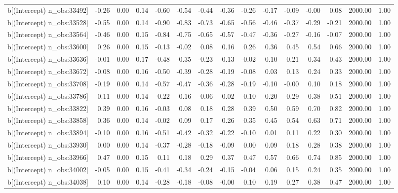 \begin{table}[ht]
\begin{tabular}{rrrrrrrrrrrrrrr}
  b[(Intercept) n\_obs:33492] & -0.26 & 0.00 & 0.14 & -0.60 & -0.54 & -0.44 & -0.36 & -0.26 & -0.17 & -0.09 & -0.00 & 0.08 & 2000.00 & 1.00 \\ 
  b[(Intercept) n\_obs:33528] & -0.55 & 0.00 & 0.14 & -0.90 & -0.83 & -0.73 & -0.65 & -0.56 & -0.46 & -0.37 & -0.29 & -0.21 & 2000.00 & 1.00 \\ 
  b[(Intercept) n\_obs:33564] & -0.46 & 0.00 & 0.15 & -0.84 & -0.75 & -0.65 & -0.57 & -0.47 & -0.36 & -0.27 & -0.16 & -0.07 & 2000.00 & 1.00 \\ 
  b[(Intercept) n\_obs:33600] & 0.26 & 0.00 & 0.15 & -0.13 & -0.02 & 0.08 & 0.16 & 0.26 & 0.36 & 0.45 & 0.54 & 0.66 & 2000.00 & 1.00 \\ 
  b[(Intercept) n\_obs:33636] & -0.01 & 0.00 & 0.17 & -0.48 & -0.35 & -0.23 & -0.13 & -0.02 & 0.10 & 0.21 & 0.34 & 0.43 & 2000.00 & 1.00 \\ 
  b[(Intercept) n\_obs:33672] & -0.08 & 0.00 & 0.16 & -0.50 & -0.39 & -0.28 & -0.19 & -0.08 & 0.03 & 0.13 & 0.24 & 0.33 & 2000.00 & 1.00 \\ 
  b[(Intercept) n\_obs:33708] & -0.19 & 0.00 & 0.14 & -0.57 & -0.47 & -0.36 & -0.28 & -0.19 & -0.10 & -0.00 & 0.10 & 0.18 & 2000.00 & 1.00 \\ 
  b[(Intercept) n\_obs:33786] & 0.11 & 0.00 & 0.14 & -0.22 & -0.16 & -0.06 & 0.02 & 0.10 & 0.20 & 0.29 & 0.38 & 0.51 & 2000.00 & 1.00 \\ 
  b[(Intercept) n\_obs:33822] & 0.39 & 0.00 & 0.16 & -0.03 & 0.08 & 0.18 & 0.28 & 0.39 & 0.50 & 0.59 & 0.70 & 0.82 & 2000.00 & 1.00 \\ 
  b[(Intercept) n\_obs:33858] & 0.36 & 0.00 & 0.14 & -0.02 & 0.09 & 0.17 & 0.26 & 0.35 & 0.45 & 0.54 & 0.63 & 0.71 & 2000.00 & 1.00 \\ 
  b[(Intercept) n\_obs:33894] & -0.10 & 0.00 & 0.16 & -0.51 & -0.42 & -0.32 & -0.22 & -0.10 & 0.01 & 0.11 & 0.22 & 0.30 & 2000.00 & 1.00 \\ 
  b[(Intercept) n\_obs:33930] & 0.00 & 0.00 & 0.14 & -0.37 & -0.28 & -0.18 & -0.09 & 0.00 & 0.09 & 0.18 & 0.28 & 0.38 & 2000.00 & 1.00 \\ 
  b[(Intercept) n\_obs:33966] & 0.47 & 0.00 & 0.15 & 0.11 & 0.18 & 0.29 & 0.37 & 0.47 & 0.57 & 0.66 & 0.74 & 0.85 & 2000.00 & 1.00 \\ 
  b[(Intercept) n\_obs:34002] & -0.05 & 0.00 & 0.15 & -0.41 & -0.34 & -0.24 & -0.15 & -0.04 & 0.06 & 0.15 & 0.24 & 0.35 & 2000.00 & 1.00 \\ 
  b[(Intercept) n\_obs:34038] & 0.10 & 0.00 & 0.14 & -0.28 & -0.18 & -0.08 & -0.00 & 0.10 & 0.19 & 0.27 & 0.38 & 0.47 & 2000.00 & 1.00 \\ 

\end{tabular}
\end{table}
